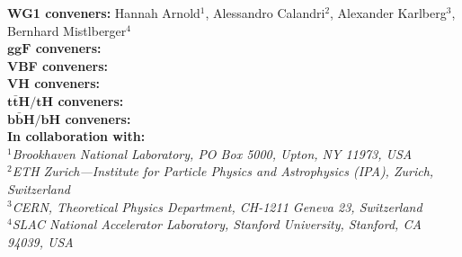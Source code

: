 \documentclass[11pt]{article}
\begin{document}
\begin{titlepage}
\begin{center}
	\textrm{
    {\large {\bf WG1 conveners:} Hannah Arnold$^{1}$, Alessandro Calandri$^{2}$, Alexander Karlberg$^{3}$, Bernhard Mistlberger$^{4}$\\
     {\bf $\boldsymbol{ggF}$ conveners:}  \\
     {\bf VBF conveners:} \\
     {\bf $\boldsymbol{VH}$ conveners:} \\
     {\bf $\boldsymbol{t\bar{t}H/tH}$ conveners:} \\
     {\bf $\boldsymbol{b\bar{b}H/bH}$ conveners:} \\
     {\bf In collaboration with:} 
    }} \\[0.3cm]	
    \textit{$^{1}$Brookhaven National Laboratory, PO Box 5000, Upton, NY 11973, USA}\\   
    \textit{$^{2}$ETH Zurich—Institute for Particle Physics and Astrophysics (IPA), Zurich, Switzerland}\\
    \textit{$^{3}$CERN, Theoretical Physics Department, CH-1211 Geneva 23, Switzerland } \\
    \textit{$^{4}$SLAC National Accelerator Laboratory, Stanford University, Stanford, CA 94039, USA } \\

\end{center}
\end{titlepage}
\end{document}
